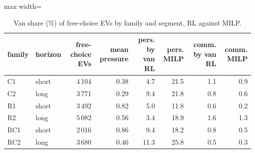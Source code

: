 \begin{table}[H]\centering
\small
\caption{Van share (\%) of free-choice EVs by family and segment, RL against MILP.}\label{tab:families}
\begin{adjustbox}{max width=\textwidth}\begin{tabular}{llrrrrrr}\toprule
family & horizon & free-choice EVs & mean pressure & pers. by van RL & pers. MILP & comm. by van RL & comm. MILP \\ \midrule
C1 & short & 4\,104 & 0.38 & 4.7 & 21.5 & 1.1 & 0.9 \\
C2 & long & 3\,771 & 0.29 & 9.4 & 21.8 & 0.8 & 0.6 \\
R1 & short & 3\,492 & 0.82 & 5.0 & 11.8 & 0.6 & 0.2 \\
R2 & long & 5\,082 & 0.56 & 3.4 & 18.9 & 1.6 & 1.3 \\
RC1 & short & 2\,016 & 0.86 & 9.4 & 18.2 & 0.8 & 0.5 \\
RC2 & long & 3\,680 & 0.46 & 11.3 & 25.8 & 0.5 & 0.3 \\
\bottomrule\end{tabular}\end{adjustbox}\end{table}
